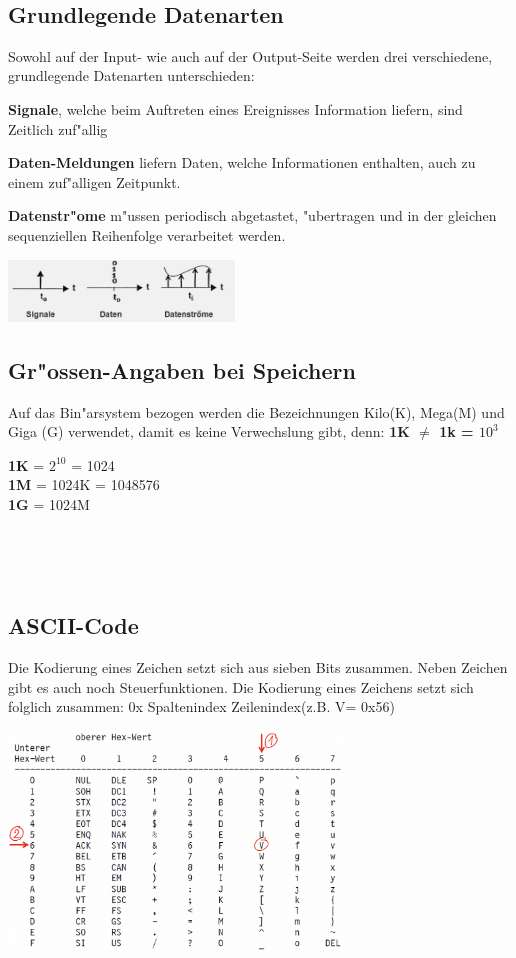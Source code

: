 \begin{minipage}[t]{9cm}
\ \
	\subsection{Grundlegende Datenarten}
	Sowohl auf der Input- wie auch auf der Output-Seite werden drei verschiedene, grundlegende Datenarten unterschieden:
	
	\textbf{Signale}, welche beim Auftreten eines Ereignisses Information liefern, sind Zeitlich zuf"allig

	\textbf{Daten-Meldungen} liefern Daten, welche Informationen enthalten, auch zu einem zuf"alligen Zeitpunkt.

	\textbf{Datenstr"ome} m"ussen periodisch abgetastet, "ubertragen und in der gleichen sequenziellen Reihenfolge verarbeitet werden.
	
	\includegraphics[width=6cm]{pics/Datenarten}
	
	\subsection{Gr"ossen-Angaben bei Speichern}
	Auf das Bin"arsystem bezogen werden die Bezeichnungen Kilo(K), Mega(M) und Giga (G) verwendet, damit es keine Verwechslung gibt, denn: \textbf{1K $\neq$ 1k = $10^3$}

	\textbf{1K} = $2^{10}$ = 1024\\
	\textbf{1M} = 1024K = 1048576\\
	\textbf{1G} = 1024M
	\end{minipage}
%
\begin{minipage}{0.5cm}
	\ \
\end{minipage}
%
\begin{minipage}[t]{9cm}
\ \
	\subsection{ASCII-Code}
	Die Kodierung eines Zeichen setzt sich aus sieben Bits zusammen. Neben Zeichen gibt es auch noch Steuerfunktionen. Die Kodierung eines Zeichens setzt sich folglich zusammen: \dq 0x Spaltenindex Zeilenindex\dq  (z.B. \dq V\dq = 0x56)
	
	\includegraphics[width=9cm]{pics/ASCII-Tabelle}
\end{minipage}

